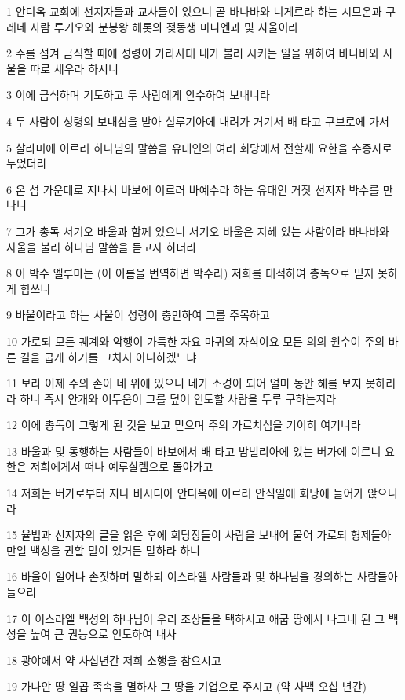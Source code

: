 \par 1 안디옥 교회에 선지자들과 교사들이 있으니 곧 바나바와 니게르라 하는 시므온과 구레네 사람 루기오와 분봉왕 헤롯의 젖동생 마나엔과 및 사울이라
\par 2 주를 섬겨 금식할 때에 성령이 가라사대 내가 불러 시키는 일을 위하여 바나바와 사울을 따로 세우라 하시니
\par 3 이에 금식하며 기도하고 두 사람에게 안수하여 보내니라
\par 4 두 사람이 성령의 보내심을 받아 실루기아에 내려가 거기서 배 타고 구브로에 가서
\par 5 살라미에 이르러 하나님의 말씀을 유대인의 여러 회당에서 전할새 요한을 수종자로 두었더라
\par 6 온 섬 가운데로 지나서 바보에 이르러 바예수라 하는 유대인 거짓 선지자 박수를 만나니
\par 7 그가 총독 서기오 바울과 함께 있으니 서기오 바울은 지혜 있는 사람이라 바나바와 사울을 불러 하나님 말씀을 듣고자 하더라
\par 8 이 박수 엘루마는 (이 이름을 번역하면 박수라) 저희를 대적하여 총독으로 믿지 못하게 힘쓰니
\par 9 바울이라고 하는 사울이 성령이 충만하여 그를 주목하고
\par 10 가로되 모든 궤계와 악행이 가득한 자요 마귀의 자식이요 모든 의의 원수여 주의 바른 길을 굽게 하기를 그치지 아니하겠느냐
\par 11 보라 이제 주의 손이 네 위에 있으니 네가 소경이 되어 얼마 동안 해를 보지 못하리라 하니 즉시 안개와 어두움이 그를 덮어 인도할 사람을 두루 구하는지라
\par 12 이에 총독이 그렇게 된 것을 보고 믿으며 주의 가르치심을 기이히 여기니라
\par 13 바울과 및 동행하는 사람들이 바보에서 배 타고 밤빌리아에 있는 버가에 이르니 요한은 저희에게서 떠나 예루살렘으로 돌아가고
\par 14 저희는 버가로부터 지나 비시디아 안디옥에 이르러 안식일에 회당에 들어가 앉으니라
\par 15 율법과 선지자의 글을 읽은 후에 회당장들이 사람을 보내어 물어 가로되 형제들아 만일 백성을 권할 말이 있거든 말하라 하니
\par 16 바울이 일어나 손짓하며 말하되 이스라엘 사람들과 및 하나님을 경외하는 사람들아 들으라
\par 17 이 이스라엘 백성의 하나님이 우리 조상들을 택하시고 애굽 땅에서 나그네 된 그 백성을 높여 큰 권능으로 인도하여 내사
\par 18 광야에서 약 사십년간 저희 소행을 참으시고
\par 19 가나안 땅 일곱 족속을 멸하사 그 땅을 기업으로 주시고 (약 사백 오십 년간)
